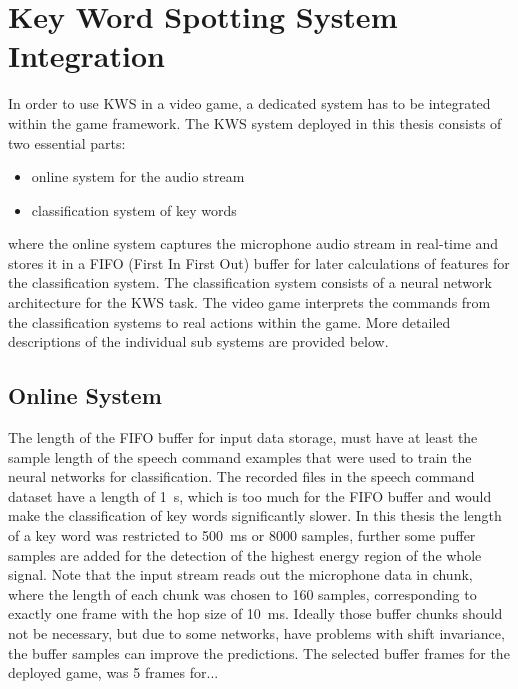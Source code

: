 
\section{Key Word Spotting System Integration}
\thesisStateNotReady
In order to use KWS in a video game, a dedicated system has to be integrated within the game framework.
The KWS system deployed in this thesis consists of two essential parts:
\begin{itemize}
	\item online system for the audio stream
	\item classification system of key words
\end{itemize}
where the online system captures the microphone audio stream in real-time and stores it in a FIFO (First In First Out) buffer for later calculations of features for the classification system.
The classification system consists of a neural network architecture for the KWS task.
The video game interprets the commands from the classification systems to real actions within the game.
More detailed descriptions of the individual sub systems are provided below.



\subsection{Online System}
The length of the FIFO buffer for input data storage, must have at least the sample length of the speech command examples that were used to train the neural networks for classification.
The recorded files in the speech command dataset have a length of \SI{1}{\second}, which is too much for the FIFO buffer and would make the classification of key words significantly slower.
In this thesis the length of a key word was restricted to \SI{500}{\milli\second} or 8000 samples, further some puffer samples are added for the detection of the highest energy region of the whole signal.
Note that the input stream reads out the microphone data in chunk, where the length of each chunk was chosen to 160 samples, corresponding to exactly one frame with the hop size of \SI{10}{\milli\second}.
Ideally those buffer chunks should not be necessary, but due to some networks, have problems with shift invariance, the buffer samples can improve the predictions.
The selected buffer frames for the deployed game, was 5 frames for...

